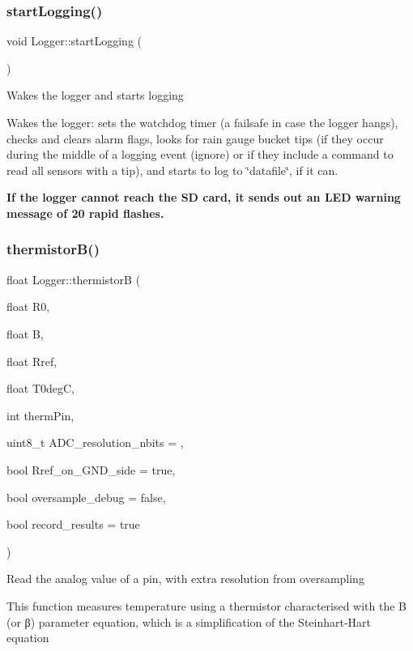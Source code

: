 \subsubsection{\texorpdfstring{start\+Logging()}{startLogging()}}
{\footnotesize\ttfamily void Logger\+::start\+Logging (\begin{DoxyParamCaption}{ }\end{DoxyParamCaption})}

Wakes the logger and starts logging

Wakes the logger\+: sets the watchdog timer (a failsafe in case the logger hangs), checks and clears alarm flags, looks for rain gauge bucket tips (if they occur during the middle of a logging event (ignore) or if they include a command to read all sensors with a tip), and starts to log to \char`\"{}datafile\char`\"{}, if it can.

{\bfseries If the logger cannot reach the SD card, it sends out an L\+ED warning message of 20 rapid flashes.}\mbox{\label{classLogger_a55d923b98a6c503fccb25bfd4af32f3d}} 
\subsubsection{\texorpdfstring{thermistor\+B()}{thermistorB()}}
{\footnotesize\ttfamily float Logger\+::thermistorB (\begin{DoxyParamCaption}\item[{float}]{R0,  }\item[{float}]{B,  }\item[{float}]{Rref,  }\item[{float}]{T0degC,  }\item[{int}]{therm\+Pin,  }\item[{uint8\+\_\+t}]{A\+D\+C\+\_\+resolution\+\_\+nbits = {},  }\item[{bool}]{Rref\+\_\+on\+\_\+\+G\+N\+D\+\_\+side = {\ttfamily true},  }\item[{bool}]{oversample\+\_\+debug = {\ttfamily false},  }\item[{bool}]{record\+\_\+results = {\ttfamily true} }\end{DoxyParamCaption})}

Read the analog value of a pin, with extra resolution from oversampling

This function measures temperature using a thermistor characterised with the B (or β) parameter equation, which is a simplification of the Steinhart-\/\+Hart equation

